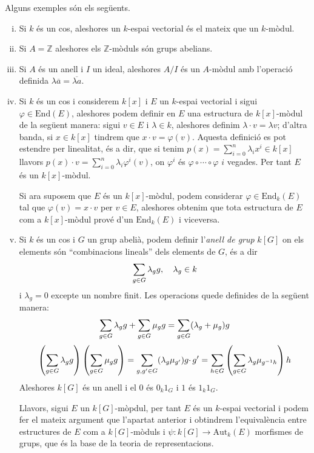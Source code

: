 \documentclass[../../../main.tex]{subfiles}
\begin{document}
\begin{ej}
Alguns exemples són els següents.
\begin{enumerate}[(i)]
    \item Si $k$ és un cos, aleshores un $k$-espai vectorial és el mateix que un $k$-mòdul.
    \item Si $A = \mathbb{Z}$ aleshores els $\mathbb{Z}$-mòduls són grups abelians.
    \item Si $A$ és un anell i $I$ un ideal, aleshores $A/I$ és un $A$-mòdul amb l'operació definida $\lambda\overline{a} = \overline{\lambda a}$.
    \item Si $k$ és un cos i considerem $k[x]$ i $E$ un $k$-espai vectorial i sigui $\varphi\in \mathrm{End}(E)$, aleshores podem definir en $E$ una estructura de $k[x]$-mòdul de la següent manera: sigui $v\in E$ i $\lambda\in k$, aleshores definim $\lambda\cdotp v = \lambda v$; d'altra banda, si $x\in k[x]$ tindrem que $x \cdotp v = \varphi(v)$. Aquesta definició es pot estendre per linealitat, és a dir, que si tenim $p(x) = \sum_{i=0}^n \lambda_ix^{i}\in k[x]$ llavors $p(x)\cdotp v = \sum_{i=0}^n\lambda_i\varphi^{i}(v)$, on $\varphi^{i}$ és $\varphi\circ\cdots\circ\varphi$ $i$ vegades. Per tant $E$ és un $k[x]$-mòdul.
    
    Si ara suposem que $E$ és un $k[x]$-mòdul, podem considerar $\varphi\in\mathrm{End}_k(E)$ tal que $\varphi(v) = x\cdotp v$ per $v\in E$, aleshores obtenim que tota estructura de $E$ com a $k[x]$-mòdul prové d'un $\mathrm{End}_k(E)$ i viceversa.
    
    \item Si $k$ és un cos i $G$ un grup abelià, podem definir l'\textit{anell de grup} $k[G]$ on els elements són ``combinacions lineals'' dels elements de $G$, és a dir
    \begin{equation}
        \notag
        \sum_{g\in G}\lambda_gg,\quad \lambda_g\in k
    \end{equation}
    i $\lambda_g = 0$ excepte un nombre finit. Les operacions quede definides de la següent manera:
    \begin{equation}
        \notag
        \sum_{g\in G}\lambda_gg + \sum_{g\in G}\mu_gg = \sum_{g\in G}(\lambda_g+\mu_g)g
    \end{equation}
    \begin{equation}
        \notag
        \left(\sum_{g\in G}\lambda_gg\right)\left(\sum_{g\in G}\mu_gg\right) = \sum_{g,g'\in G}(\lambda_g\mu_{g'})g\cdotp g' = \sum_{h\in G}\left(\sum_{g\in G}\lambda_g\mu_{g^{-1}h}\right)h
    \end{equation}
    Aleshores $k[G]$ és un anell i el 0 és $0_k1_G$ i $1$ és $1_k1_G$. 
    
    Llavors, sigui $E$ un $k[G]$-mòpdul, per tant $E$ és un $k$-espai vectorial i podem fer el mateix argument que l'apartat anterior i obtindrem l'equivalència entre estructures de $E$ com a $k[G]$-mòduls i $\psi:k[G]\to \mathrm{Aut}_k(E)$ morfismes de grups, que és la base de la teoria de representacions.
\end{enumerate}  
\end{ej}
\end{document}
